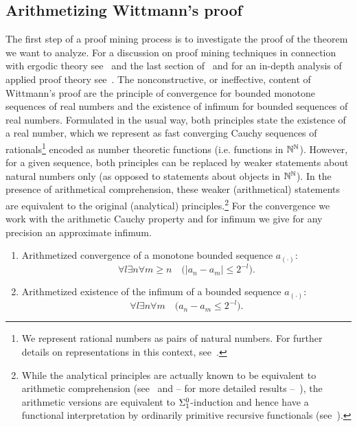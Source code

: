 \subsection{Arithmetizing Wittmann's proof}\label{s:ArProof}
The first step of a proof mining process  is to investigate the proof of the 
theorem we want to analyze. 
For a discussion on proof mining techniques in connection with ergodic theory 
see~\cite{Gerhardy2010} and the last section of~\cite{AGT10} and for
an in-depth analysis of applied proof theory see~\cite{Kohlenbach08}.
The nonconstructive, or ineffective, content of Wittmann's proof are the principle
of convergence for bounded monotone sequences of real numbers and the existence of
infimum for bounded sequences of real numbers. 
Formulated in the usual way, both principles state the existence
of a real number, which we represent as fast converging 
Cauchy sequences of rationals\footnote{We represent rational numbers as pairs of natural numbers. For further details on representations in this context, see~\cite{Kohlenbach08}.} encoded as number theoretic functions (i.e. functions in $\mathbb{N}^{\mathbb{N}}$).
However, for a given sequence, both principles can be replaced by 
weaker statements about natural numbers only (as opposed to statements about objects in $\mathbb{N}^{\mathbb{N}}$).
In the presence of arithmetical comprehension, these weaker (arithmetical) statements are
equivalent to the original (analytical) principles.\footnote{
While the analytical principles are actually known to be equivalent to
arithmetic comprehension (see~\cite{Simpson1999} and -- for more
detailed results --~\cite{Kohlenbach00}), the arithmetic versions are equivalent
to $\Sigma^0_1$-induction and hence have a functional interpretation
by ordinarily primitive recursive functionals (see~\cite{Kohlenbach08}).
}
For the convergence we work with the arithmetic Cauchy property
and for infimum we give for any precision an approximate infimum.
\begin{enumerate}
	\item Arithmetized convergence of a monotone bounded sequence $a_{(\cdot)}$:
	\[\forall l\exists n\forall m\geq n\quad \big( |a_n-a_m|\leq 2^{-l}\big).\]
	\item Arithmetized existence of the infimum of a bounded sequence $a_{(\cdot)}$:
	\[\forall l\exists n\forall m\quad \big( a_n-a_m\leq 2^{-l}\big).\]
\end{enumerate}
